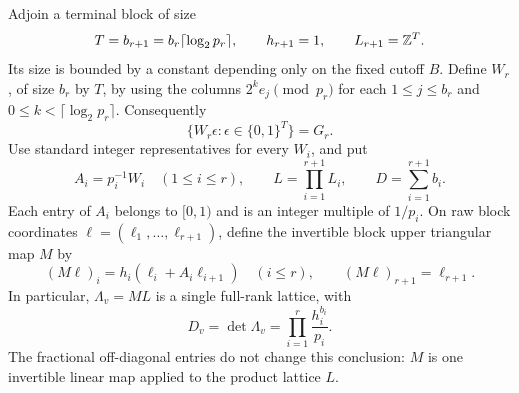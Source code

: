 Adjoin a terminal block of size
\[
 T=b_{r+1}=b_r\lceil\log_2 p_r\rceil,
 \qquad h_{r+1}=1,\qquad L_{r+1}=\mathbb Z^T.
\]
Its size is bounded by a constant depending only on the fixed cutoff $B$.
Define $W_r$, of size $b_r$ by $T$, by using the columns
$2^k e_j\pmod {p_r}$ for each $1\le j\le b_r$ and
$0\le k<\lceil\log_2 p_r\rceil$.  Consequently
\begin{equation}
 \{W_r\epsilon:\epsilon\in\{0,1\}^T\}=G_r.
 \label{eq:hierarchy-terminal-exhaustion}
\end{equation}
Use standard integer representatives for every $W_i$, and put
\[
 A_i=p_i^{-1}W_i\quad (1\le i\le r),\qquad
 L=\prod_{i=1}^{r+1}L_i,\qquad D=\sum_{i=1}^{r+1}b_i.
\]
Each entry of $A_i$ belongs to $[0,1)$ and is an integer multiple of
$1/p_i$.  On raw block coordinates $\ell=(\ell_1,\ldots,\ell_{r+1})$,
define the invertible block upper triangular map $M$ by
\begin{equation}
 (M\ell)_i=h_i(\ell_i+A_i\ell_{i+1})\quad (i\le r),
 \qquad (M\ell)_{r+1}=\ell_{r+1}.
 \label{eq:hierarchy-map}
\end{equation}
In particular, $\Lambda_v=ML$ is a single full-rank lattice, with
\begin{equation}
 D_v=\det\Lambda_v=\prod_{i=1}^r\frac{h_i^{b_i}}{p_i}.
 \label{eq:hierarchy-determinant}
\end{equation}
The fractional off-diagonal entries do not change this conclusion: $M$ is
one invertible linear map applied to the product lattice $L$.

